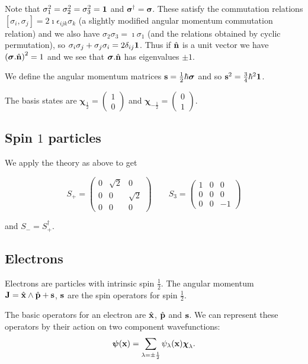 \documentclass{notes}
\newcommand{\com}[2]{\left[#1,#2\right]}
\newcommand{\sv}{\boldsymbol{\sigma}}
\newcommand{\cv}{\boldsymbol{\chi}}
\newcommand{\pv}{\boldsymbol{\psi}}
\begin{document}
Note that $\sigma_1^2 = \sigma_2^2 = \sigma_3^2 = \mathbf{1}$ and
$\sv^\dag = \sv$.  These satisfy the commutation relations
$\com{\sigma_i}{\sigma_j} = 2 \imath \epsilon_{i j k} \sigma_k$
(a slightly modified angular momentum commutation relation) and
we also have $\sigma_2 \sigma_3 = \imath \sigma_1$ (and the relations
obtained by cyclic permutation), so $\sigma_i \sigma_j
+ \sigma_j \sigma_i = 2 \delta_{i j} \mathbf{1}$.  Thus if $\Hat{\mathbf{n}}$ is
a unit vector we have $\left( \sv.\Hat{\vect{n}} \right)^2 = 1$
and we see that $\sv. \Hat{\vect{n}}$ has eigenvalues $\pm 1$.

We define the angular momentum matrices $\vect{s} = \frac{1}{2} \hbar
\sv$ and so $\mathbf{s}^2 = \frac{3}{4} \hbar^2 \mathbf{1}$.

The basis states are $\cv_{\frac{1}{2}} = \begin{pmatrix} 1 \\ 0 \end{pmatrix}$
and $\cv_{-\frac{1}{2}} = \begin{pmatrix} 0 \\ 1 \end{pmatrix}$.

\subsection{Spin $1$ particles}

We apply the theory as above to get

\[
S_+ = \begin{pmatrix} 0 & \sqrt{2} & 0 \\ 0 & 0 & \sqrt{2} \\ 0 & 0 &
  0 \end{pmatrix}
\qquad
S_3 = \begin{pmatrix} 1 & 0 & 0 \\ 0 & 0 & 0 \\ 0 & 0 & -1 \end{pmatrix}
\]

and $S_- = S_+^\dag$.

\subsection{Electrons}

Electrons are particles with intrinsic spin $\frac{1}{2}$.  The
angular momentum $\mathbf{J} = \Hat{\mathbf{x}} \wedge \Hat{\mathbf{p}}
+ \mathbf{s}$, $\mathbf{s}$ are the spin operators for spin $\frac{1}{2}$.

The basic operators for an electron are $\Hat{\mathbf{x}}$, $\Hat{\mathbf{p}}$
and $\mathbf{s}$.  We can represent these operators by their action
on two component wavefunctions:
\[
\pv(\vect{x}) = \sum_{\lambda =
\pm \frac{1}{2}} \psi_\lambda(\vect{x}) \cv_\lambda.
\]
\end{document}
